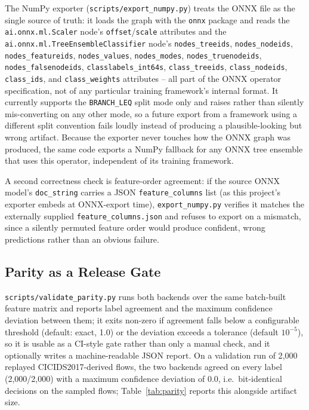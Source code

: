 \documentclass[runningheads]{llncs}
\begin{document}
The NumPy exporter (\texttt{scripts/export\_numpy.py}) treats the ONNX file as the single source of truth: it loads the graph with the \texttt{onnx} package and reads the \texttt{ai.onnx.ml.Scaler} node's \texttt{offset}/\texttt{scale} attributes and the \texttt{ai.onnx.ml.TreeEnsembleClassifier} node's \texttt{nodes\_treeids}, \texttt{nodes\_nodeids}, \texttt{nodes\_featureids}, \texttt{nodes\_values}, \texttt{nodes\_modes}, \texttt{nodes\_truenodeids}, \texttt{nodes\_falsenodeids}, \texttt{classlabels\_int64s}, \texttt{class\_treeids}, \texttt{class\_nodeids}, \texttt{class\_ids}, and \texttt{class\_weights} attributes -- all part of the ONNX operator specification, not of any particular training framework's internal format. It currently supports the \texttt{BRANCH\_LEQ} split mode only and raises rather than silently mis-converting on any other mode, so a future export from a framework using a different split convention fails loudly instead of producing a plausible-looking but wrong artifact. Because the exporter never touches how the ONNX graph was produced, the same code exports a NumPy fallback for any ONNX tree ensemble that uses this operator, independent of its training framework.

A second correctness check is feature-order agreement: if the source ONNX model's \texttt{doc\_string} carries a JSON \texttt{feature\_columns} list (as this project's exporter embeds at ONNX-export time), \texttt{export\_numpy.py} verifies it matches the externally supplied \texttt{feature\_columns.json} and refuses to export on a mismatch, since a silently permuted feature order would produce confident, wrong predictions rather than an obvious failure.

\subsection{Parity as a Release Gate}
\label{sec:parity}

\texttt{scripts/validate\_parity.py} runs both backends over the same batch-built feature matrix and reports label agreement and the maximum confidence deviation between them; it exits non-zero if agreement falls below a configurable threshold (default: exact, 1.0) or the deviation exceeds a tolerance (default $10^{-5}$), so it is usable as a CI-style gate rather than only a manual check, and it optionally writes a machine-readable JSON report. On a validation run of 2{,}000 replayed CICIDS2017-derived flows, the two backends agreed on every label (2{,}000/2{,}000) with a maximum confidence deviation of 0.0, i.e.\ bit-identical decisions on the sampled flows; Table~\ref{tab:parity} reports this alongside artifact size.
\end{document}
